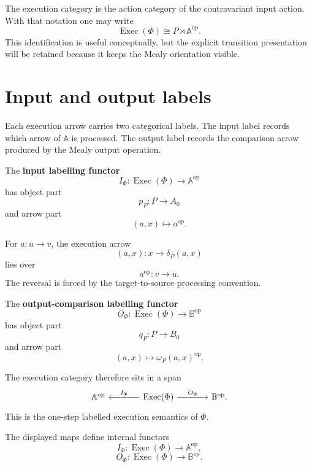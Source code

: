 The execution category is the action category of the contravariant input
action. With that notation one may write
\[
    \operatorname{Exec}(\Phi)
    \cong
    P\rtimes\mathbb A^{\mathrm{op}}.
\]
This identification is useful conceptually, but the explicit transition
presentation will be retained because it keeps the Mealy orientation visible.

\section{Input and output labels}
\label{subsec:execution-labels}

Each execution arrow carries two categorical labels. The input label records
which arrow of \(\mathbb A\) is processed. The output label records the
comparison arrow produced by the Mealy output operation.

\begin{definition}
\label{def:input-labelling-functor}
The \textbf{input labelling functor}
\[
    I_\Phi:
    \operatorname{Exec}(\Phi)
    \longrightarrow
    \mathbb A^{\mathrm{op}}
\]
has object part
\[
    p_P:P\to A_0
\]
and arrow part
\[
    (a,x)\longmapsto a^{\mathrm{op}}.
\]
\end{definition}

For \(a:u\to v\), the execution arrow
\[
    (a,x):x\to\delta_P(a,x)
\]
lies over
\[
    a^{\mathrm{op}}:v\to u.
\]
The reversal is forced by the target-to-source processing convention.

\begin{definition}
\label{def:output-labelling-functor}
The \textbf{output-comparison labelling functor}
\[
    O_\Phi:
    \operatorname{Exec}(\Phi)
    \longrightarrow
    \mathbb B^{\mathrm{op}}
\]
has object part
\[
    q_P:P\to B_0
\]
and arrow part
\[
    (a,x)
    \longmapsto
    \omega_P(a,x)^{\mathrm{op}}.
\]
\end{definition}

The execution category therefore sits in a span
\[
\begin{tikzcd}[column sep=large]
    \mathbb A^{\mathrm{op}}
    &
    \operatorname{Exec}(\Phi)
        \arrow[l, "I_\Phi"']
        \arrow[r, "O_\Phi"]
    &
    \mathbb B^{\mathrm{op}}.
\end{tikzcd}
\]
This is the one-step labelled execution semantics of \(\Phi\).

\begin{proposition}
\label{prop:functoriality-execution-labels}
The displayed maps define internal functors
\[
    I_\Phi:
    \operatorname{Exec}(\Phi)\to\mathbb A^{\mathrm{op}},
\]
\[
    O_\Phi:
    \operatorname{Exec}(\Phi)\to\mathbb B^{\mathrm{op}}.
\]
\end{proposition}

